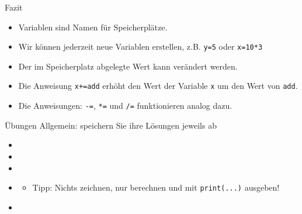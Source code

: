 \begin{frame}{Fazit}
\begin{itemize}
    \item Variablen sind Namen für Speicherplätze.
    \item Wir können jederzeit neue Variablen erstellen, z.B. \lstinline|y=5| oder \lstinline|x=10*3|
    \item Der im Speicherplatz abgelegte Wert kann verändert werden.
    \item Die Anweisung \lstinline|x+=add| erhöht den Wert der Variable \lstinline|x| um den Wert von \lstinline|add|.
    \item Die Anweisungen: \lstinline|-=|, \lstinline|*=| und \lstinline|/=|  funktionieren analog dazu.
\end{itemize}
\end{frame}

\begin{frame}{Übungen}
Allgemein: speichern Sie ihre Lösungen jeweils ab
\begin{itemize}
    \item {}
    \item {}
    \item {}
    \item {}
    \begin{itemize}
    \item Tipp: Nichts zeichnen, nur berechnen und mit \lstinline|print(...)| ausgeben!
    \end{itemize}
    \item {}
\end{itemize}
\end{frame}